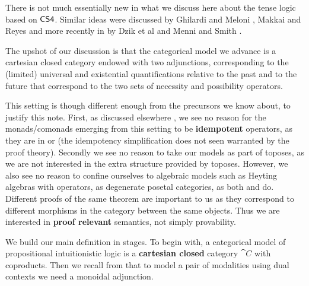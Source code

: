 There is not much essentially new in what we discuss here about the
tense logic based on $\sf{CS4}$. Similar ideas were discussed by
Ghilardi and Meloni \cite{ghilardi1988}, Makkai and Reyes
\cite{makkai1995} and more recently in by Dzik et al
\cite{dziketal2012,dziketal2014} and Menni and Smith
\cite{Menni:2014}.

The upshot of our discussion is that the categorical model we advance
is a cartesian closed category endowed with two adjunctions,
corresponding to the (limited) universal and existential
quantifications relative to the past and to the future that correspond
to the two sets of necessity and possibility operators.

This setting is though different enough from the precursors we know
about, to justify this note. First, as discussed elsewhere
\cite{bierman2000}, we see no reason for the monads/comonads emerging
from this setting to be \textbf{idempotent} operators, as they are in \cite{ghilardi1988} or \cite{makkai1995} (the idempotency
simplification does not seen warranted by the proof theory). Secondly we see no reason to take our models as part of toposes, as we are not interested in the extra structure provided by toposes.  However, we also see no reason to confine ourselves to algebraic models such as Heyting algebras with operators, as degenerate posetal categories, as both \cite{dziketal2012} and \cite{Menni:2014} do. Different proofs of
the same theorem are important to us as they correspond to different
morphisms in the category between the same objects. Thus we are
interested in \textbf{proof relevant} semantics, not simply
provability.

We build our main definition in stages. To begin with, a categorical
model of propositional intuitionistic logic is a \textbf{cartesian
  closed} category $\cat{C}$ with coproducts.
Then we recall from \cite{bierman2000} that to model a pair of
modalities using dual contexts we need a monoidal adjunction.

